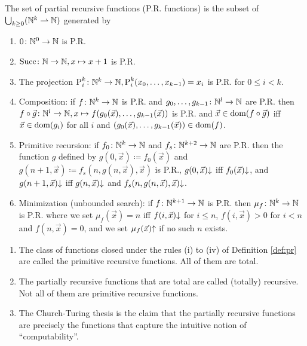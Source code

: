 \begin{boxdefi}\label{def:pr}
    The set of \alert{partial recursive functions (P.R. functions)} is the subset of $\bigcup_{k \ge 0}(\mathbb{N}^k \rightharpoonup \mathbb{N})$ generated by
    \begin{enumerate}
        \item $0 \colon \mathbb{N}^0 \to \mathbb{N}$ is P.R.
        \item $\text{Succ} \colon \mathbb{N} \to \mathbb{N}, x \mapsto x + 1$ is P.R.
        \item The projection $\text{P}_{i}^{k} \colon \mathbb{N}^k \to \mathbb{N},  \text{P}_{i}^{k}(x_0, \dots, x_{k-1}) = x_i$ is P.R. for $0 \le i < k$.
        \item Composition: if $f \colon \mathbb{N}^k \to \mathbb{N}$ is P.R. and $g_0, \dots, g_{k-1} \colon \mathbb{N}^l \to \mathbb{N}$ are P.R. then $f \circ \vec{g} \colon \mathbb{N}^l \to \mathbb{N}, x \mapsto f(g_0(\vec{x}), \dots, g_{k-1}(\vec{x}))$ is P.R. and $\vec{x} \in \text{dom}(f \circ \vec{g})$ iff $\vec{x} \in \text{dom}(g_i)$ for all $i$ and $(g_0(\vec{x}), \dots, g_{k-1}(\vec{x})) \in \text{dom}(f)$.
    \item Primitive recursion: if $f_0 \colon \mathbb{N}^k \to \mathbb{N}$ and $f_s \colon \mathbb{N}^{k+2} \to \mathbb{N}$ are P.R. then the function $g$ defined by $g(0, \vec{x}) \coloneq f_0(\vec{x})$ and $g(n+1, \vec{x}) \coloneq f_s(n, g(n, \vec{x}), \vec{x})$ is P.R., $g(0, \vec{x}){\downarrow}$ iff $f_0(\vec{x}){\downarrow}$, and $g(n + 1, \vec{x}){\downarrow}$ iff $g(n, \vec{x}){\downarrow}$ and $f_s(n, g(n, \vec{x}), \vec{x}){\downarrow}$. 
    \item Minimization (unbounded search): if $f \colon \mathbb{N}^{k + 1} \to \mathbb{N}$ is P.R. then $\mu_f \colon \mathbb{N}^k \to \mathbb{N}$ is P.R. where we set $\mu_f(\vec{x}) = n$ iff $f(i, \vec{x}){\downarrow}$ for $i \le n$, $f(i, \vec{x}) > 0$ for $i < n$ and $f(n, \vec{x}) = 0$, and we set $\mu_f(\vec{x}){\uparrow}$ if no such $n$ exists.
    \end{enumerate}
\end{boxdefi}

\begin{rem}
    \hfill
    \begin{enumerate}
        \item The class of functions closed under the rules (i) to (iv) of Definition \ref{def:pr} are called the \alert{primitive recursive functions}. All  of them are total.
        \item The partially recursive functions that are total are called \alert{(totally) recursive}. Not all of them are primitive recursive functions.
        \item The Church-Turing thesis is the claim that the partially recursive functions are precisely the functions that capture the intuitive notion of ``computability''.
    \end{enumerate}
\end{rem}

